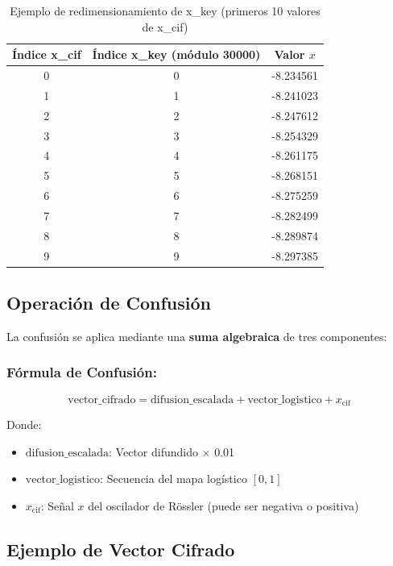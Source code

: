 \documentclass[12pt,a4paper]{article}
\begin{document}
\begin{table}[H]
\centering
\caption{Ejemplo de redimensionamiento de x\_key (primeros 10 valores de x\_cif)}
\label{tab:resize}
\begin{tabular}{@{}ccc@{}}
\toprule
\textbf{Índice x\_cif} & \textbf{Índice x\_key (módulo 30000)} & \textbf{Valor $x$} \\ \midrule
0 & 0 & -8.234561 \\
1 & 1 & -8.241023 \\
2 & 2 & -8.247612 \\
3 & 3 & -8.254329 \\
4 & 4 & -8.261175 \\
5 & 5 & -8.268151 \\
6 & 6 & -8.275259 \\
7 & 7 & -8.282499 \\
8 & 8 & -8.289874 \\
9 & 9 & -8.297385 \\ \bottomrule
\end{tabular}
\end{table}

\subsection{Operación de Confusión}

La confusión se aplica mediante una \textbf{suma algebraica} de tres componentes:

\subsubsection*{Fórmula de Confusión:}
\begin{equation}
\text{vector\_cifrado} = \text{difusion\_escalada} + \text{vector\_logistico} + x_{\text{cif}}
\label{eq:confusion}
\end{equation}

Donde:
\begin{itemize}
    \item $\text{difusion\_escalada}$: Vector difundido $\times$ 0.01
    \item $\text{vector\_logistico}$: Secuencia del mapa logístico $[0, 1]$
    \item $x_{\text{cif}}$: Señal $x$ del oscilador de Rössler (puede ser negativa o positiva)
\end{itemize}

\subsection{Ejemplo de Vector Cifrado}
\end{document}
